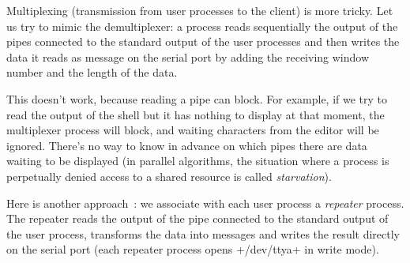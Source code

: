 \begin{myimage}[width="55\%"]
\end{myimage}
% 
Multiplexing (transmission from user processes to the client) is
more tricky. Let us try to mimic the demultiplexer: a process reads
sequentially the output of the pipes connected to the standard output
of the user processes and then writes the data it reads as message on
the serial port by adding the receiving window number and the length
of the data.
%
\begin{myimage}[width="100\%"]
\end{myimage}
% 
This doesn't work, because reading a pipe can block. For example, if we
try to read the output of the shell but it has nothing to
display at that moment, the multiplexer process will block, and waiting
characters from the editor will be ignored.
There's no way to know in advance on which pipes there are
data waiting to be displayed (in parallel algorithms, the situation
where a process is perpetually denied access to a shared resource is
called \emph{starvation}).

Here is another approach~: we associate with each user process a
\emph{repeater} process. The repeater reads the output of the pipe
connected to the standard output of the user process, transforms the
data into messages and writes the result directly on the serial port
(each repeater process opens \ml+/dev/ttya+ in write mode).
%
\begin{myimage}[width="100\%"]
\end{myimage}
% 

